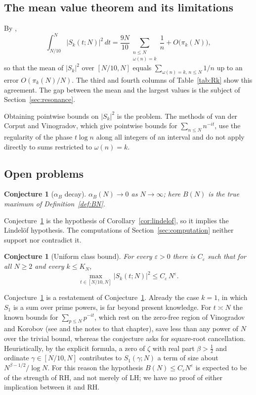 \documentclass[11pt]{amsart}
\newtheorem{conjecture}[theorem]{Conjecture}
\theoremstyle{definition}
\theoremstyle{remark}
\newcommand{\half}{\tfrac{1}{2}}
\begin{document}
\subsection{The mean value theorem and its limitations}

By \cite[Corollary~3]{montgomery-vaughan1974},
\[
  \int_{N/10}^{N} |S_k(t;N)|^2\,dt
  = \frac{9N}{10} \sum_{\substack{n \le N \\ \omega(n) = k}} \frac1n
  +O\bigl(\pi_k(N)\bigr),
\]
so that the mean of $|S_k|^2$ over $[N/10,N]$ equals
$\sum_{\omega(n)=k,\,n\le N}1/n$ up to an error $O(\pi_k(N)/N)$.  The
third and fourth columns of Table~\ref{tab:Rk} show this agreement.
The gap between the mean and the largest values is the subject of
Section~\ref{sec:resonance}.

Obtaining pointwise bounds on $|S_k|^2$ is the problem.  The methods of
van der Corput and Vinogradov, which give pointwise bounds for
$\sum_{n\le N}n^{-it}$, use the regularity of the phase $t\log n$ along
all integers of an interval and do not apply directly to sums restricted
to $\omega(n)=k$.

\subsection{Open problems}

\begin{conjecture}[$\alpha_B$ decay]\label{conj:decay}
$\alpha_B(N) \to 0$ as $N \to \infty$; here $B(N)$ is the true maximum
of Definition~\ref{def:BN}.
\end{conjecture}

Conjecture~\ref{conj:decay} is the hypothesis of
Corollary~\ref{cor:lindelof}, so it implies the Lindel\"of hypothesis.
The computations of Section~\ref{sec:computation} neither support nor
contradict it.

\begin{conjecture}[Uniform class bound]\label{conj:uniform}
For every $\varepsilon > 0$ there is $C_\varepsilon$ such that for all
$N\ge2$ and every $k \le K_N$,
\[
  \max_{t \in [N/10, N]} |S_k(t;N)|^2
  \le C_{\varepsilon} \, N^\varepsilon.
\]
\end{conjecture}

Conjecture~\ref{conj:uniform} is a restatement of
Conjecture~\ref{conj:decay}.  Already the case $k=1$, in which $S_1$ is a
sum over prime powers, is far beyond present knowledge.  For $t\asymp N$
the known bounds for $\sum_{p\le N}p^{-it}$, which rest on the zero-free
region of Vinogradov and Korobov (see \cite[Chapter~VI]{titchmarsh1986}
and the notes to that chapter), save less than any power of $N$ over the
trivial bound, whereas the conjecture asks for square-root cancellation.
Heuristically, by the explicit formula, a zero of $\zeta$ with real part
$\beta>\half$ and ordinate $\gamma\in[N/10,N]$ contributes to
$S_1(\gamma;N)$ a term of size about $N^{\beta-1/2}/\log N$.  For this
reason the hypothesis $B(N)\le C_\varepsilon N^\varepsilon$ is expected to
be of the strength of RH, and not merely of LH; we have no proof of
either implication between it and RH.
\end{document}
